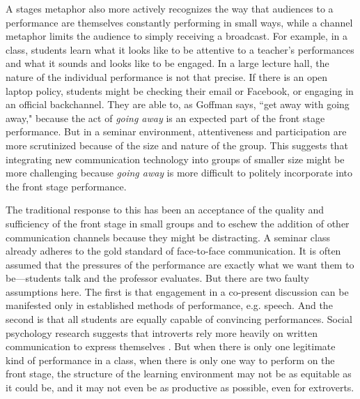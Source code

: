A stages metaphor also more actively recognizes the way that audiences to a performance are themselves constantly performing in small ways, while a channel metaphor limits the audience to simply receiving a broadcast. For example, in a class, students learn what it looks like to be attentive to a teacher's performances and what it sounds and looks like to be engaged. In a large lecture hall, the nature of the individual performance is not that precise. If there is an open laptop policy, students might be checking their email or Facebook, or engaging in an official backchannel.  They are able to, as Goffman says, ``get away with going away," because the act of \emph{going away} is an expected part of the front stage performance. But in a seminar environment, attentiveness and participation are more scrutinized because of the size and nature of the group. This suggests that integrating new communication technology into groups of smaller size might be more challenging because \emph{going away} is more difficult to politely incorporate into the front stage performance.  


The traditional response to this has been an acceptance of the quality and sufficiency of the front stage in small groups and to eschew the addition of other communication channels because they might be distracting.  A seminar class already adheres to the gold standard of face-to-face communication. It is often assumed that the pressures of the performance are exactly what we want them to be---students talk and the professor evaluates.  But there are two faulty assumptions here.  The first is that engagement in a co-present discussion can be manifested only in established methods of performance, e.g.  speech. And the second is that all students are equally capable of convincing performances. Social psychology research suggests that introverts rely more heavily on written communication to express themselves \citep{Ross:2009gp. Wilson:2010ib}. But when there is only one legitimate kind of performance in a class, when there is only one way to perform on the front stage, the structure of the learning environment may not be as equitable as it could be, and it may not even be as productive as possible, even for extroverts. 

